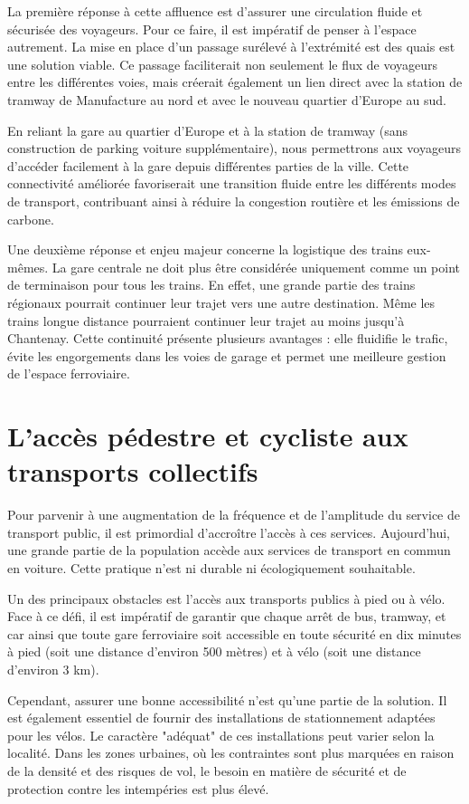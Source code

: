 La première réponse à cette affluence est d'assurer une circulation
fluide et sécurisée des voyageurs. Pour ce faire, il est impératif de
penser à l'espace autrement. La mise en place d'un passage surélevé à
l'extrémité est des quais est une solution viable. Ce passage
faciliterait non seulement le flux de voyageurs entre les différentes
voies, mais créerait également un lien direct avec la station de
tramway de Manufacture au nord et avec le nouveau quartier d'Europe au
sud.

En reliant la gare au quartier d'Europe et à la station de tramway
(sans construction de parking voiture supplémentaire), nous
permettrons aux voyageurs d'accéder facilement à la gare depuis
différentes parties de la ville. Cette connectivité améliorée
favoriserait une transition fluide entre les différents modes de
transport, contribuant ainsi à réduire la congestion routière et les
émissions de carbone.

Une deuxième réponse et enjeu majeur concerne la logistique des trains
eux-mêmes. La gare centrale ne doit plus être considérée uniquement
comme un point de terminaison pour tous les trains. En effet, une
grande partie des trains régionaux pourrait continuer leur trajet vers
une autre destination. Même les trains longue distance pourraient
continuer leur trajet au moins jusqu'à Chantenay. Cette continuité
présente plusieurs avantages : elle fluidifie le trafic, évite les
engorgements dans les voies de garage et permet une meilleure gestion
de l'espace ferroviaire.


\section{L'accès pédestre et cycliste aux transports collectifs}

Pour parvenir à une augmentation de la fréquence et de l'amplitude du
service de transport public, il est primordial d'accroître l'accès à
ces services. Aujourd'hui, une grande partie de la population accède
aux services de transport en commun en voiture. Cette pratique n'est
ni durable ni écologiquement souhaitable.

Un des principaux obstacles est l'accès aux transports publics à pied
ou à vélo. Face à ce défi, il est impératif de garantir que chaque
arrêt de bus, tramway, et car ainsi que toute gare ferroviaire soit
accessible en toute sécurité en dix minutes à pied (soit une distance
d'environ 500 mètres) et à vélo (soit une distance d'environ 3 km).

Cependant, assurer une bonne accessibilité n'est qu'une partie de la
solution. Il est également essentiel de fournir des installations de
stationnement adaptées pour les vélos. Le caractère "adéquat" de ces
installations peut varier selon la localité. Dans les zones urbaines,
où les contraintes sont plus marquées en raison de la densité et des
risques de vol, le besoin en matière de sécurité et de protection
contre les intempéries est plus élevé.

